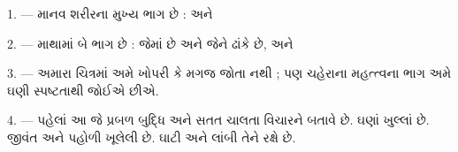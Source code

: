 %
%
%

\VUsaut{4.0mm}
\VUsaut{2.0mm}

\VUsaut{2.4mm}
\VUsaut{3.0mm}

\VUsaut{3.0mm}

1. --- માનવ શરીરના મુખ્ય ભાગ છે :   અને

2. --- માથામાં બે ભાગ છે :  જેમાં  છે અને
જેને  ઢાંકે છે, અને 

3. --- અમારા ચિત્રમાં અમે ખોપરી કે મગજ જોતા નથી ; પણ ચહેરાના મહત્ત્વના
ભાગ અમે ઘણી સ્પષ્ટતાથી જોઈએ છીએ.

4. --- પહેલાં આ  જે પ્રબળ બુદ્ધિ અને સતત ચાલતા વિચારને
બતાવે છે.  ઘણાં ખુલ્લાં છે.  જીવંત અને પહોળી
ખૂલેલી છે. ઘાટી  અને લાંબી  તેને રક્ષે છે.

